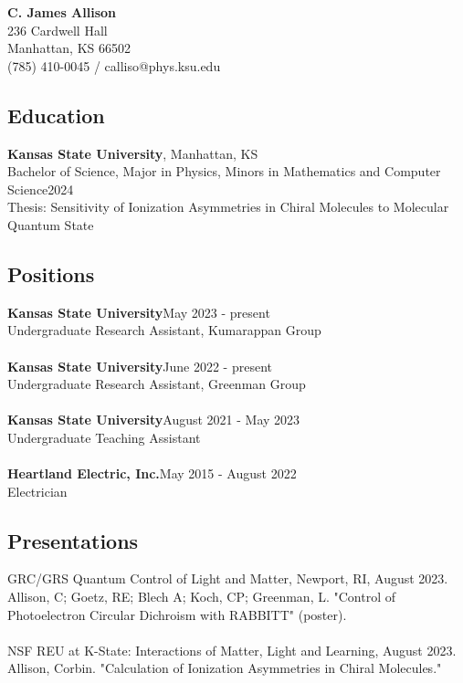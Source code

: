 \documentclass{article}
\begin{document}
\noindent\begin{center}
	{\large{\textbf{C. James Allison}}}\\
	236 Cardwell Hall\\
	Manhattan, KS 66502\\
	(785) 410-0045 / calliso@phys.ksu.edu
\end{center}
\subsection*{Education} \textbf{Kansas State University}, Manhattan, KS \\
Bachelor of Science, Major in Physics, Minors in Mathematics and Computer Science\hfill 2024 \\Thesis: Sensitivity of Ionization Asymmetries in Chiral Molecules to Molecular Quantum State
\subsection*{Positions}
\textbf{Kansas State University}\hfill May 2023 - present\\
{Undergraduate Research Assistant, Kumarappan Group} \\\\
\textbf{Kansas State University}\hfill June 2022 - present\\
{Undergraduate Research Assistant, Greenman Group}\\\\
\textbf{Kansas State University}\hfill August 2021 - May 2023\\
{Undergraduate Teaching Assistant}  \\\\
\textbf{Heartland Electric, Inc.}\hfill May 2015 - August 2022\\
{Electrician}  
\subsection*{Presentations}
GRC/GRS Quantum Control of Light and Matter, Newport, RI, August 2023. Allison, C; Goetz, RE; Blech A; Koch, CP; Greenman, L. "Control of Photoelectron Circular Dichroism with RABBITT" (poster). \\\\
NSF REU at K-State: Interactions of Matter, Light and Learning, August 2023. Allison, Corbin. "Calculation of Ionization Asymmetries in Chiral Molecules."
\end{document}
